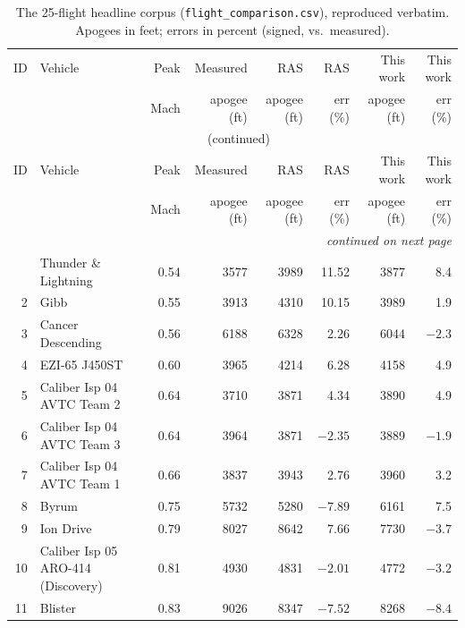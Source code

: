 \begingroup
\footnotesize
\setlength{\tabcolsep}{3pt}
\begin{longtable}{@{}r >{\raggedright\arraybackslash}p{} r r r r r r@{}}
\caption{The 25-flight headline corpus (\texttt{flight\_comparison.csv}),
reproduced verbatim. Apogees in feet; errors in percent (signed, vs.\
measured).}\label{tab:headline25}\\
\toprule
ID & Vehicle & Peak & Measured & RAS & RAS & This work & This work \\
   &         & Mach & apogee (ft) & apogee (ft) & err (\%) & apogee (ft) & err (\%) \\
\midrule
\endfirsthead
\multicolumn{8}{c}{\tablename~\thetable\ (continued)}\\
\toprule
ID & Vehicle & Peak & Measured & RAS & RAS & This work & This work \\
   &         & Mach & apogee (ft) & apogee (ft) & err (\%) & apogee (ft) & err (\%) \\
\midrule
\endhead
\midrule
\multicolumn{8}{r}{\textit{continued on next page}}\\
\endfoot
\bottomrule
\endlastfoot
1  & Thunder \& Lightning                & 0.54 & 3577   & 3989   & 11.52 & 3877   & 8.4  \\
2  & Gibb                                & 0.55 & 3913   & 4310   & 10.15 & 3989   & 1.9  \\
3  & Cancer Descending                   & 0.56 & 6188   & 6328   & 2.26  & 6044   & $-2.3$ \\
4  & EZI-65 J450ST                       & 0.60 & 3965   & 4214   & 6.28  & 4158   & 4.9  \\
5  & Caliber Isp 04 AVTC Team 2          & 0.64 & 3710   & 3871   & 4.34  & 3890   & 4.9  \\
6  & Caliber Isp 04 AVTC Team 3          & 0.64 & 3964   & 3871   & $-2.35$ & 3889 & $-1.9$ \\
7  & Caliber Isp 04 AVTC Team 1          & 0.66 & 3837   & 3943   & 2.76  & 3960   & 3.2  \\
8  & Byrum                               & 0.75 & 5732   & 5280   & $-7.89$ & 6161 & 7.5  \\
9  & Ion Drive                           & 0.79 & 8027   & 8642   & 7.66  & 7730   & $-3.7$ \\
10 & Caliber Isp 05 ARO-414 (Discovery)  & 0.81 & 4930   & 4831   & $-2.01$ & 4772 & $-3.2$ \\
11 & Blister                             & 0.83 & 9026   & 8347   & $-7.52$ & 8268 & $-8.4$ \\

\end{longtable}
